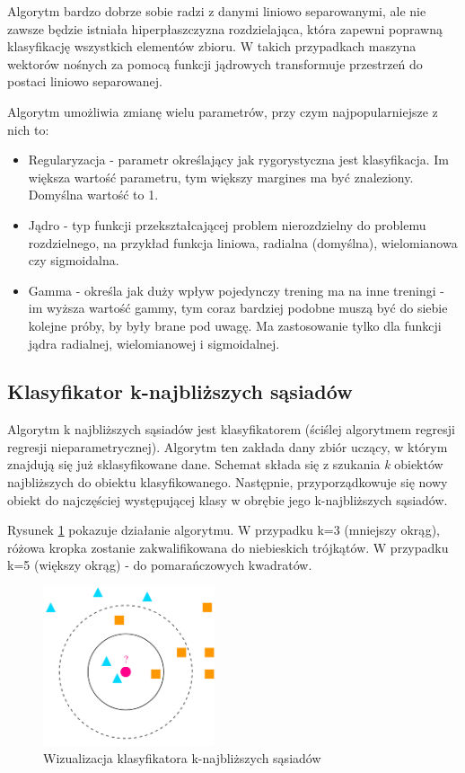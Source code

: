 \documentclass[a4paper,11pt]{article}
\begin{document}
Algorytm bardzo dobrze sobie radzi z danymi liniowo separowanymi, ale nie zawsze będzie istniała hiperpłaszczyzna rozdzielająca, która zapewni poprawną klasyfikację wszystkich elementów zbioru. W takich przypadkach maszyna wektorów nośnych za pomocą funkcji jądrowych transformuje przestrzeń do postaci liniowo separowanej.

Algorytm umożliwia zmianę wielu parametrów, przy czym najpopularniejsze z nich to:
\begin{itemize}

    \item Regularyzacja - parametr określający jak rygorystyczna jest klasyfikacja. Im większa wartość parametru, tym większy margines ma być znaleziony. Domyślna wartość to 1.
    \item Jądro - typ funkcji przekształcającej problem nierozdzielny do problemu rozdzielnego, na przykład funkcja liniowa, radialna (domyślna), wielomianowa czy sigmoidalna. 
    \item Gamma - określa jak duży wpływ pojedynczy trening ma na inne treningi - im wyższa wartość gammy, tym coraz bardziej podobne muszą być do siebie kolejne próby, by były brane pod uwagę. Ma zastosowanie tylko dla funkcji jądra radialnej, wielomianowej i sigmoidalnej.
\end{itemize}

\subsection{Klasyfikator k-najbliższych sąsiadów}
Algorytm k najbliższych sąsiadów jest klasyfikatorem (ściślej algorytmem regresji regresji nieparametrycznej). Algorytm ten zakłada dany zbiór uczący, w którym znajdują się już sklasyfikowane dane. Schemat składa się z szukania \textit{k} obiektów najbliższych do obiektu klasyfikowanego. Następnie, przyporządkowuje się nowy obiekt do najczęściej występującej klasy w obrębie jego k-najbliższych sąsiadów.

Rysunek \ref{fig:knn} pokazuje działanie algorytmu. W przypadku k=3 (mniejszy okrąg), różowa kropka zostanie zakwalifikowana do niebieskich trójkątów. W przypadku k=5 (większy okrąg) - do pomarańczowych kwadratów.

\begin{figure}[!htbp]
    	\centering
    	\includegraphics[width=0.45\textwidth]{images/knn.png}
    	\caption{ Wizualizacja klasyﬁkatora k-najbliższych sąsiadów}
    	\label{fig:knn}
\end{figure}
\end{document}
